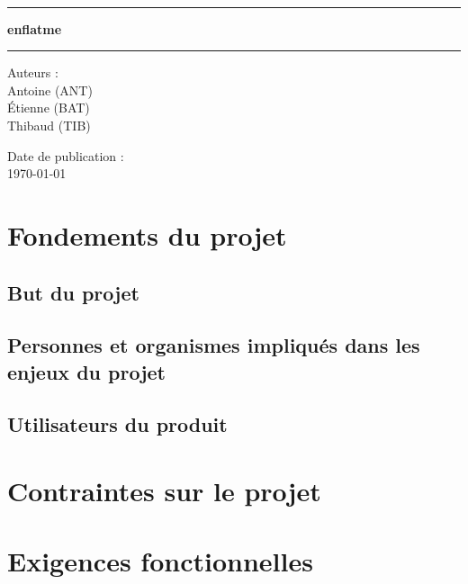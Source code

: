 \documentclass[a4paper, 12pt, french]{report}
\newcommand{\nomProjet}{enflatme\xspace}
\begin{document}
	\begin{titlepage}
		\begin{center}
			\LARGE{} \\
		    \rule{\linewidth}{1.5pt}
		    \huge{\textbf{\nomProjet}}
		    \rule{\linewidth}{1.5pt} \newline{} \newline{}
		\end{center}
		\begin{center}
		    \large{Auteurs :}\\ Antoine  (ANT)\\ Étienne  (BAT) \\ Thibaud  (TIB)
		\end{center}
		\vspace{50px}
		\begin{center}
			\large{Date de publication :}\\ \today
		\end{center}
	\end{titlepage}
	\newpage

	\tableofcontents
	\pagebreak

	\chapter{Fondements du projet}
		\section{But du projet}
			

		\section{Personnes et organismes impliqués dans les enjeux du projet}
			

		\section{Utilisateurs du produit}
			

	\chapter{Contraintes sur le projet}
	\chapter{Exigences fonctionnelles}
\end{document}

